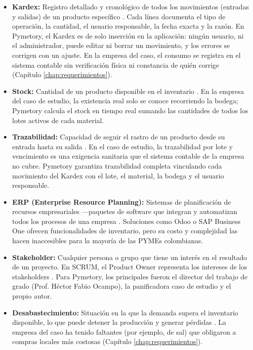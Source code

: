 \begin{itemize}
    \item \textbf{Kardex:} Registro detallado y cronológico de todos los movimientos (entradas y salidas) de un producto específico \cite{ballou2004logistica}. Cada línea documenta el tipo de operación, la cantidad, el usuario responsable, la fecha exacta y la razón. En Pymetory, el Kardex es de solo inserción en la aplicación: ningún usuario, ni el administrador, puede editar ni borrar un movimiento, y los errores se corrigen con un ajuste. En la empresa del caso, el consumo se registra en el sistema contable sin verificación física ni constancia de quién corrige (Capítulo \ref{chap:requerimientos}).
    
    \item \textbf{Stock:} Cantidad de un producto disponible en el inventario \cite{ballou2004logistica}. En la empresa del caso de estudio, la existencia real solo se conoce recorriendo la bodega; Pymetory calcula el stock en tiempo real sumando las cantidades de todos los lotes activos de cada material.
    
    \item \textbf{Trazabilidad:} Capacidad de seguir el rastro de un producto desde su entrada hasta su salida \cite{ballou2004logistica}. En el caso de estudio, la trazabilidad por lote y vencimiento es una exigencia sanitaria que el sistema contable de la empresa no cubre. Pymetory garantiza trazabilidad completa vinculando cada movimiento del Kardex con el lote, el material, la bodega y el usuario responsable.
    
    \item \textbf{ERP (Enterprise Resource Planning):} Sistemas de planificación de recursos empresariales ---paquetes de software que integran y automatizan todos los procesos de una empresa \cite{ballou2004logistica}. Soluciones como Odoo o SAP Business One ofrecen funcionalidades de inventario, pero su costo y complejidad las hacen inaccesibles para la mayoría de las PYMEs colombianas.
    
    \item \textbf{Stakeholder:} Cualquier persona o grupo que tiene un interés en el resultado de un proyecto. En SCRUM, el Product Owner representa los intereses de los stakeholders \cite{schwaber2020scrumguide}. Para Pymetory, los principales fueron el director del trabajo de grado (Prof. Héctor Fabio Ocampo), la panificadora caso de estudio y el propio autor.
    
    \item \textbf{Desabastecimiento:} Situación en la que la demanda supera el inventario disponible, lo que puede detener la producción y generar pérdidas \cite{ballou2004logistica}. La empresa del caso ha tenido faltantes (por ejemplo, de sal) que obligaron a compras locales más costosas (Capítulo \ref{chap:requerimientos}).
    

\end{itemize}
